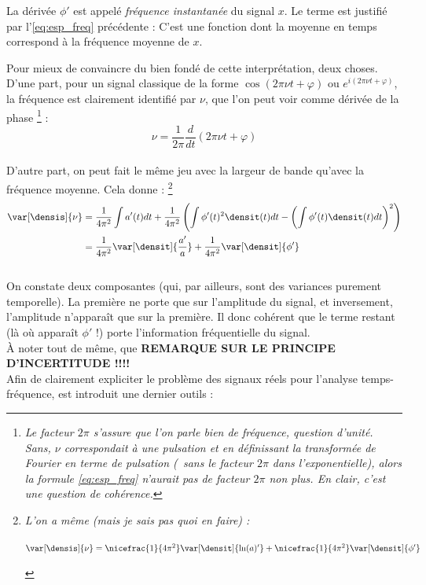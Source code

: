 \begin{definition}
	La dérivée $\phi'$ est appelé \emph{fréquence instantanée} du signal $x$. Le terme est justifié par l'\cref{eq:esp_freq} précédente : C'est une fonction dont la moyenne en temps correspond à la fréquence moyenne de $x$.
\end{definition}

Pour mieux de convaincre du bien fondé de cette interprétation, deux choses.
\\
D'une part, pour un signal classique de la forme $\cos(2\pi\nu t+\varphi)$ ou $e^{i(2\pi\nu t + \varphi)}$, la fréquence est clairement identifié par $\nu$, que l'on peut voir comme dérivée de la phase
	\footnote{\itshape 
			Le facteur $2\pi$ s'assure que l'on parle bien de fréquence, question d'unité. Sans, $\nu$ correspondait à une pulsation et en définissant la transformée de Fourier en terme de pulsation (\ie~sans le facteur $2\pi$ dans l'exponentielle), alors la formule \eqref{eq:esp_freq} n'aurait pas de facteur $2\pi$ non plus. En clair, c'est une question de cohérence.} :
\[\nu = \frac{1}{2\pi}\frac{d}{dt}(2\pi\nu t+\varphi)\]
\\
D'autre part, on peut fait le même jeu avec la largeur de bande qu'avec la fréquence moyenne. Cela donne :
	\footnote{\itshape 
		L'on a même (mais je sais pas quoi en faire) : 
		\begin{center}
			$\var[\densis]{\nu} =  \nicefrac{1}{4\pi^2}\var[\densit]{\ln(a)'} + \nicefrac{1}{4\pi^2} \var[\densit]{\phi'}$
		\end{center}}
\begin{align*}
	\var[\densis]{\nu} &= \frac{1}{4\pi^2} \int a'(t) dt + \frac{1}{4\pi^2}\left(\int \phi'(t)^2 \densit(t) dt - \left(\int \phi'(t) \densit(t) dt \right)^2 \right) \\
	&= \frac{1}{4\pi^2}\var[\densit]{\frac{a'}{a}} +\frac{1}{4\pi^2} \var[\densit]{\phi'}
\end{align*}
\\
On constate deux composantes (qui, par ailleurs, sont des variances purement temporelle). La première ne porte que sur l'amplitude du signal, et inversement, l'amplitude n'apparaît que sur la première. Il donc cohérent que le terme restant (là où apparaît $\phi'$ !) porte l'information fréquentielle du signal.
\\

\`A noter tout de même, que \textbf{REMARQUE SUR LE PRINCIPE D'INCERTITUDE !!!!}
\\

Afin de clairement expliciter le problème des signaux réels pour l'analyse temps-fréquence, est introduit une dernier outils :


